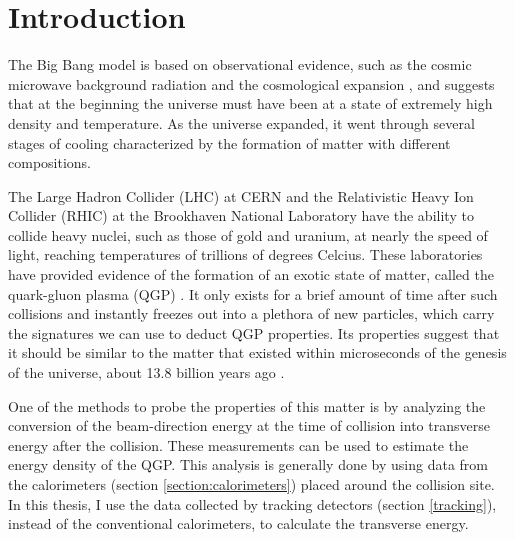 \chapter{Introduction} \label{ch:introduction}

The Big Bang model is based on observational evidence, such as the cosmic microwave background radiation and the cosmological expansion \cite{Scott:2005uf,Perlmutter:1998np}, and suggests that at the beginning the universe must have been at a state of extremely high density and temperature. As the universe expanded, it went through several stages of cooling characterized by the formation of matter with different compositions.%

The Large Hadron Collider (LHC) at CERN and the Relativistic Heavy Ion Collider (RHIC) at the Brookhaven National Laboratory have the ability to collide heavy nuclei, such as those of gold and uranium, at nearly the speed of light, reaching temperatures of trillions of degrees Celcius. These laboratories have provided evidence of the formation of an exotic state of matter, called the quark-gluon plasma (QGP) \cite{FOKA2016154,Gyulassy:2004vg}. It only exists for a brief amount of time after such collisions and instantly freezes out into a plethora of new particles, which carry the signatures we can use to deduct QGP properties. Its properties suggest that it should be similar to the matter that existed within microseconds of the genesis of the universe, about 13.8 billion years ago \cite{ADAMS2005102,2013ApJS..208...20B,2016A&A...594A..13P}.%

One of the methods to probe the properties of this matter is by analyzing the conversion of the beam-direction energy at the time of collision into transverse energy after the collision. These measurements can be used to estimate the energy density of the QGP. This analysis is generally done by using data from the calorimeters (section \ref{section:calorimeters}) placed around the collision site. In this thesis, I use the data collected by tracking detectors (section \ref{tracking}), instead of the conventional calorimeters, to calculate the transverse energy.

